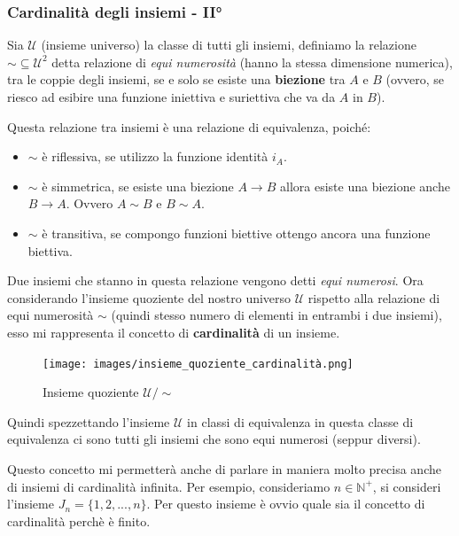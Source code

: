 \documentclass{article}
\begin{document}
\subsubsection{Cardinalità degli insiemi - II°}
Sia $\mathcal{U}$ (insieme universo) la classe di tutti gli insiemi,
definiamo la relazione $\sim\subseteq\mathcal{U}^2$ detta relazione
di \textit{equi numerosità} (hanno la stessa dimensione numerica), tra le coppie degli insiemi, se e solo se esiste
una \textbf{biezione} tra $A$ e $B$ (ovvero, se riesco ad esibire una funzione
iniettiva e suriettiva che va da $A$ in $B$).

Questa relazione tra insiemi è una relazione di equivalenza, poiché:
\begin{itemize}
    \item $\sim$ è riflessiva, se utilizzo la funzione identità $i_A$.
    \item $\sim$ è simmetrica, se esiste una biezione $A\rightarrow B$ allora
          esiste una biezione anche $B\rightarrow A$. Ovvero $A\sim B$ e $B\sim A$.
    \item $\sim$ è transitiva, se compongo funzioni biettive ottengo ancora una
          funzione biettiva.
\end{itemize}

Due insiemi che stanno in questa relazione vengono detti \textit{equi numerosi}. Ora
considerando l'insieme quoziente del nostro universo $\mathcal{U}$ rispetto alla
relazione di equi numerosità $\sim$ (quindi stesso numero di elementi in entrambi
i due insiemi), esso mi rappresenta il concetto di \textbf{cardinalità}
di un insieme.

\begin{figure}[H]
    \centering
    \texttt{[image: images/insieme\_quoziente\_cardinalità.png]}
    \caption{Insieme quoziente $\mathcal{U} / \sim$}
\end{figure}

Quindi spezzettando l'insieme $\mathcal{U}$ in classi di equivalenza
in questa classe di equivalenza ci sono tutti gli insiemi
che sono equi numerosi (seppur diversi).

Questo concetto mi permetterà anche di parlare in maniera molto precisa anche di
insiemi di cardinalità infinita.
\newline
\newline
Per esempio, consideriamo $n\in\mathbb{N}^+$, si consideri l'insieme $J_n=\{1,2,...,n\}$. Per questo
insieme è ovvio quale sia il concetto di cardinalità perchè è finito.
\end{document}
